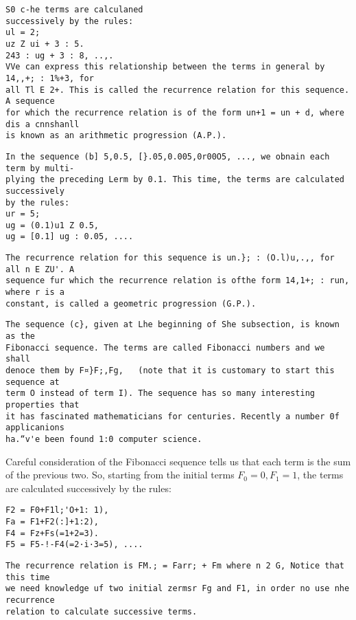 \documentclass[]{article}
\begin{document}
\begin{verbatim}
S0 c-he terms are calculaned
successively by the rules:
ul = 2;
uz Z ui + 3 : 5.
243 : ug + 3 : 8, ..,.
VVe can express this relationship between the terms in general by 14,,+; : 1%+3, for
all Tl E 2+. This is called the recurrence relation for this sequence. A sequence
for which the recurrence relation is of the form un+1 = un + d, where dis a cnnshanll
is known as an arithmetic progression (A.P.).
\end{verbatim}
\begin{verbatim}
In the sequence (b] 5,0.5, [}.05,0.005,0r00O5, ..., we obnain each term by multi-
plying the preceding Lerm by 0.1. This time, the terms are calculated successively
by the rules:
ur = 5;
ug = (0.1)u1 Z 0.5,
ug = [0.1] ug : 0.05, ....
\end{verbatim}
\begin{verbatim}
The recurrence relation for this sequence is un.}; : (O.l)u,.,, for all n E ZU'. A
sequence fur which the recurrence relation is ofthe form 14,1+; : run, where r is a
constant, is called a geometric progression (G.P.).
\end{verbatim}
\begin{verbatim}
The sequence (c}, given at Lhe beginning of She subsection, is known as the
Fibonacci sequence. The terms are called Fibonacci numbers and we shall
denoce them by F¤}F;,Fg,   (note that it is customary to start this sequence at
term O instead of term I). The sequence has so many interesting properties that
it has fascinated mathematicians for centuries. Recently a number 0f applicanions
ha.“v'e been found 1:0 computer science.
\end{verbatim}

Careful consideration of the Fibonacci sequence tells us that each term is the
sum of the previous two. So, starting from the initial terms $F_0 = 0, F_1 = 1$, the
terms are calculated successively by the rules:
\begin{verbatim}
F2 = F0+F1l;'O+1: 1),
Fa = F1+F2(:]+1:2),
F4 = Fz+Fs(=1+2=3).
F5 = F5-!-F4(=2·i·3=5), ....
\end{verbatim}
\begin{verbatim}
The recurrence relation is FM.; = Farr; + Fm where n 2 G, Notice that this time
we need knowledge uf two initial zermsr Fg and F1, in order no use nhe recurrence
relation to calculate successive terms.
\end{verbatim}
\end{document}
